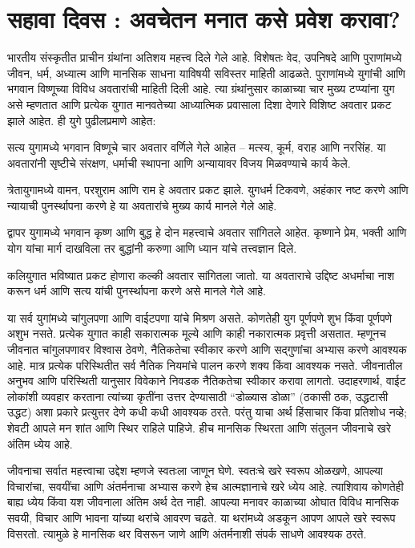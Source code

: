 \section*{सहावा दिवस : अवचेतन मनात कसे प्रवेश करावा?}
भारतीय संस्कृतीत प्राचीन ग्रंथांना अतिशय महत्त्व दिले गेले आहे. विशेषतः वेद, उपनिषदे आणि पुराणांमध्ये जीवन, धर्म, अध्यात्म आणि मानसिक साधना याविषयी सविस्तर माहिती आढळते. पुराणांमध्ये युगांची आणि भगवान विष्णूच्या विविध अवतारांची माहिती दिली आहे. त्या ग्रंथांनुसार काळाच्या चार मुख्य टप्प्यांना युग असे म्हणतात आणि प्रत्येक युगात मानवतेच्या आध्यात्मिक प्रवासाला दिशा देणारे विशिष्ट अवतार प्रकट झाले आहेत. ही युगे पुढीलप्रमाणे आहेत:

सत्य युगामध्ये भगवान विष्णूचे चार अवतार वर्णिले गेले आहेत – मत्स्य, कूर्म, वराह आणि नरसिंह. या अवतारांनी सृष्टीचे संरक्षण, धर्माची स्थापना आणि अन्यायावर विजय मिळवण्याचे कार्य केले.

त्रेतायुगामध्ये वामन, परशुराम आणि राम हे अवतार प्रकट झाले. युगधर्म टिकवणे, अहंकार नष्ट करणे आणि न्यायाची पुनर्स्थापना करणे हे या अवतारांचे मुख्य कार्य मानले गेले आहे.

द्वापर युगामध्ये भगवान कृष्ण आणि बुद्ध हे दोन महत्त्वाचे अवतार सांगितले आहेत. कृष्णाने प्रेम, भक्ती आणि योग यांचा मार्ग दाखविला तर बुद्धांनी करुणा आणि ध्यान यांचे तत्त्वज्ञान दिले.

कलियुगात भविष्यात प्रकट होणारा कल्की अवतार सांगितला जातो. या अवताराचे उद्दिष्ट अधर्माचा नाश करून धर्म आणि सत्य यांची पुनर्स्थापना करणे असे मानले गेले आहे.

या सर्व युगांमध्ये चांगुलपणा आणि वाईटपणा यांचे मिश्रण असते. कोणतेही युग पूर्णपणे शुभ किंवा पूर्णपणे अशुभ नसते. प्रत्येक युगात काही सकारात्मक मूल्ये आणि काही नकारात्मक प्रवृत्ती असतात. म्हणूनच जीवनात चांगुलपणावर विश्वास ठेवणे, नैतिकतेचा स्वीकार करणे आणि सद्गुणांचा अभ्यास करणे आवश्यक आहे. मात्र प्रत्येक परिस्थितीत सर्व नैतिक नियमांचे पालन करणे शक्य किंवा आवश्यक नसते. जीवनातील अनुभव आणि परिस्थिती यानुसार विवेकाने निवडक नैतिकतेचा स्वीकार करावा लागतो. उदाहरणार्थ, वाईट लोकांशी व्यवहार करताना त्यांच्या कृतींना उत्तर देण्यासाठी “डोळ्यास डोळा” (ठकासी ठक, उद्धटासी उद्धट) अशा प्रकारे प्रत्युत्तर देणे कधी कधी आवश्यक ठरते. परंतु याचा अर्थ हिंसाचार किंवा प्रतिशोध नव्हे; शेवटी आपले मन शांत आणि स्थिर राहिले पाहिजे. हीच मानसिक स्थिरता आणि संतुलन जीवनाचे खरे अंतिम ध्येय आहे.

जीवनाचा सर्वात महत्त्वाचा उद्देश म्हणजे स्वतःला जाणून घेणे. स्वतःचे खरे स्वरूप ओळखणे, आपल्या विचारांचा, सवयींचा आणि अंतर्मनाचा अभ्यास करणे हेच आत्मज्ञानाचे खरे ध्येय आहे. त्याशिवाय कोणतेही बाह्य ध्येय किंवा यश जीवनाला अंतिम अर्थ देत नाही. आपल्या मनावर काळाच्या ओघात विविध मानसिक सवयी, विचार आणि भावना यांच्या थरांचे आवरण चढते. या थरांमध्ये अडकून आपण आपले खरे स्वरूप विसरतो. त्यामुळे हे मानसिक थर विसरून जाणे आणि अंतर्मनाशी संपर्क साधणे आवश्यक ठरते.

